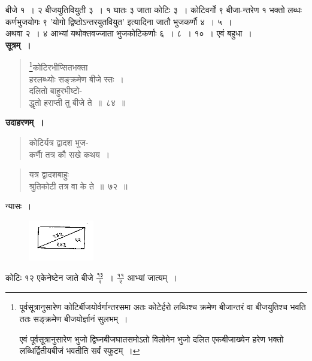 \documentclass[11pt, openany]{book}
\begin{document}
बीजे १~। २ बीजयुतिवियुती ३~। १ घातः ३ जाता कोटिः ३~। 
कोटिवर्गो ९ बीजा-न्तरेण १ भक्तो लब्धः कर्णभुजयोगः ९ 'योगो द्विष्ठोऽन्तरयुतवियुत' इत्यादिना जातौ भुजकर्णौ ४~। ५~। \\
 
 \vspace{-4mm}
अथवा २~। ४ आभ्यां यथोक्तवज्जाता भुजकोटिकर्णाः ६~। ८~। १०~। एवं बहुधा~। \\

\textbf{सूत्रम्~।} 
\begin{quote}
    \bs 
     \footnote{पूर्वसूत्रानुसारेण कोटिर्बीजयोर्वर्गान्तरसमा अतः कोटेर्हरो लब्धिश्च
क्रमेण बीजान्तरं वा बीजयुतिश्च भवति ततः सङ्क्रमेण बीजयोर्ज्ञानं सुलभम्~। 
\vspace{1mm}

\hspace{3mm} एवं पूर्वसूत्रानुसारेण भुजो द्विघ्नबीजघातसमोऽतो विलोमेन भुजो दलित एकबीजाख्येन हरेण भक्तो लब्धिर्द्वितीयबीजं भवतीति सर्वं स्फुटम्~।}कोटिरभीप्सितभक्ता \\
हरलब्ध्योः सङ्क्रमेण बीजे स्तः~।\\
दलितो बाहुरभीष्टो-\\
द्धृतो हराप्ती तु बीजे ते~॥~८४~॥
\end{quote}

 \textbf{उदाहरणम्~।} 
\begin{quote}
    \bqt 
कोटिर्यत्र द्वादश भुज-\\
कर्णाै तत्र कौ सखे कथय~।
\end{quote}

\newpage%
\begin{quote}
    \bqt 
यत्र द्वादशबाहुः \\
श्रुतिकोटी तत्र वा के ते~॥~७२~॥
\end{quote}

न्यासः~। 
\vspace{-2mm}

\begin{figure}[h!]
    \centering
    \includegraphics[scale=0.85]{graphics/capture102.png}
\end{figure}
\vspace{-2mm}

कोटिः १२ एकेनेष्टेन जाते बीजे 
$\frac{\mbox{१३}}{\mbox{२}}$~।
$\frac{\mbox{११}}{\mbox{२}}$ आभ्यां जात्यम्~। \\
\vspace{-2mm}
\end{document}

